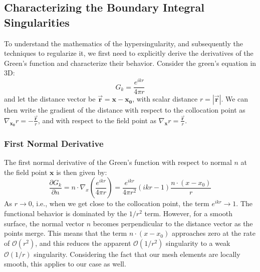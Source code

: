 \subsection{Characterizing the Boundary Integral Singularities}\label{subsec:bm-singularities}
To understand the mathematics of the hypersingularity, and subsequently the techniques to regularize it, we first need to explicitly derive the derivatives of the Green's function and characterize their behavior.
Consider the green's equation in 3D:
\begin{equation*}
    G_k = \frac{e^{i k r}}{4 \pi r}
\end{equation*}
and let the distance vector be $\mathbf{\vec{r}} = \mathbf{x} - \mathbf{x_0}$, with scalar distance $r = |\mathbf{\vec{r}}|$. 
We can then write the gradient of the distance with respect to the collocation point as $\nabla_{\mathbf{x_0}} r = -\frac{\mathbf{\vec{r}}}{r}$, and with respect to the field point as $\nabla_{\mathbf{x}} r = \frac{\mathbf{\vec{r}}}{r}$.

\subsubsection{First Normal Derivative} \label{subsubsec:first-normal-derivative}
The first normal derivative of the Green's function with respect to normal $n$ at the field point $\mathbf{x}$ is then given by:
\begin{equation} \label{eq:first-deriv-greens}
    \frac{\partial G_k}{\partial n} = n \cdot \nabla_x \left( \frac{e^{ikr}}{4\pi r} \right) = \frac{e^{ikr}}{4\pi r^2}(ikr - 1) \frac{n \cdot (x - x_0)}{r}
\end{equation}
As $r \to 0$, i.e., when we get close to the collocation point, the term $e^{ikr} \to 1$. The functional behavior is dominated by the $1/r^2$ term. 
However, for a smooth surface, the normal vector $n$ becomes perpendicular to the distance vector as the points merge. 
This means that the term $n \cdot (x - x_0)$ approaches zero at the rate of $\mathcal{O}(r^2)$, and this reduces the apparent $\mathcal{O}(1/r^2)$ singularity to a weak $\mathcal{O}(1/r)$ singularity. 
Considering the fact that our mesh elements are locally smooth, this applies to our case as well.

